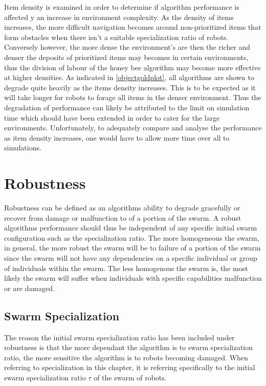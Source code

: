 Item density is examined in order to determine if algorithm performance is affected y an increase in environment complexity. As the density of items increases, the more difficult navigation becomes around non-prioritized items that form obstacles when there isn't a suitable specialization ratio of robots. Conversely however, the more dense the environment's are then the richer and denser the deposits of prioritized items may becomes in certain environments, thus the division of labour of the honey bee algorithm may become more effective at higher densities. As indicated in \ref{objectgoldplot}, all algorithms are shown to degrade quite heavily as the items density increases. This is to be expected as it will take longer for robots to forage all items in the denser environment. Thus the degradation of performance can likely be attributed to the limit on simulation time which should have been extended in order to cater for the large environments. Unfortunately, to adequately compare and analyse the performance as item density increases, one would have to allow more time over all to simulations.

\section{Robustness}
\label{results:robustness}

Robustness can be defined as an algorithms ability to degrade gracefully or recover from damage or malfunction to of a portion of the swarm. A robust algorithms performance should thus be independent of any specific initial swarm configuration such as the specialization ratio. The more homogeneous the swarm, in general, the more robust the swarm will be to failure of a portion of the swarm since the swarm will not have any dependencies on a specific individual or group of individuals within the swarm. The less homogenous the swarm is, the most likely the swarm will suffer when individuals with specific capabilities malfunction or are damaged.

\subsection{Swarm Specialization}
\label{results:specialization}

The reason the initial swarm specialization ratio has been included under robustness is that the more dependant the algorithm is to swarm specialization ratio, the more sensitive  the algorithm is to robots becoming damaged. When referring to specialization in this chapter, it is referring specifically to the initial swarm specialization ratio $\tau$ of the swarm of robots. 


